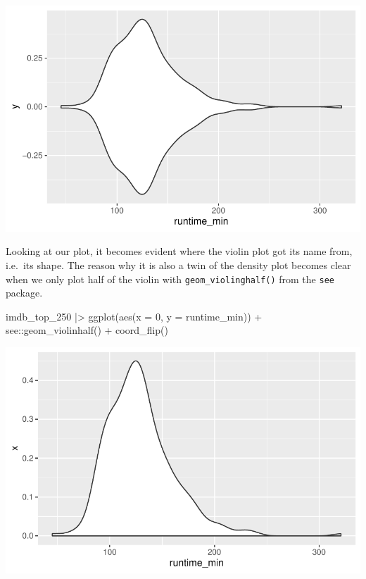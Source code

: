 \documentclass[
  letterpaper,
]{krantz}
\makeatletter
\newenvironment{Shaded}{\begin{snugshade}}{\end{snugshade}}
\newcommand{\AttributeTok}[1]{\textcolor[rgb]{0.40,0.45,0.13}{#1}}
\newcommand{\DecValTok}[1]{\textcolor[rgb]{0.68,0.00,0.00}{#1}}
\newcommand{\FunctionTok}[1]{\textcolor[rgb]{0.28,0.35,0.67}{#1}}
\newcommand{\NormalTok}[1]{\textcolor[rgb]{0.00,0.23,0.31}{#1}}
\newcommand{\SpecialCharTok}[1]{\textcolor[rgb]{0.37,0.37,0.37}{#1}}
\newenvironment{kframe}{%
\medskip{}
\setlength{\fboxsep}{.8em}
 \def\at@end@of@kframe{}%
 \ifinner\ifhmode%
  \def\at@end@of@kframe{\end{minipage}}%
  \begin{minipage}{\columnwidth}%
 \fi\fi%
 \def\FrameCommand##1{\hskip\@totalleftmargin \hskip-\fboxsep
 \colorbox{shadecolor}{##1}\hskip-\fboxsep
     \hskip-\linewidth \hskip-\@totalleftmargin \hskip\columnwidth}%
 \MakeFramed {\advance\hsize-\width
   \@totalleftmargin\z@ \linewidth\hsize
   \@setminipage}}%
 {\par\unskip\endMakeFramed%
 \at@end@of@kframe}
\renewenvironment{Shaded}{\begin{kframe}}{\end{kframe}}
\makeatother
\begin{document}
\includegraphics{08_descriptive_statistics_files/figure-pdf/violin-plot-1.pdf}

Looking at our plot, it becomes evident where the violin plot got its
name from, i.e.~its shape. The reason why it is also a twin of the
density plot becomes clear when we only plot half of the violin with
\texttt{geom\_violinghalf()} from the \texttt{see} package.

\begin{Shaded}
\begin{Highlighting}[]
\NormalTok{imdb\_top\_250 }\SpecialCharTok{|\textgreater{}}
  \FunctionTok{ggplot}\NormalTok{(}\FunctionTok{aes}\NormalTok{(}\AttributeTok{x =} \DecValTok{0}\NormalTok{, }\AttributeTok{y =}\NormalTok{ runtime\_min)) }\SpecialCharTok{+}
\NormalTok{  see}\SpecialCharTok{::}\FunctionTok{geom\_violinhalf}\NormalTok{() }\SpecialCharTok{+}
  \FunctionTok{coord\_flip}\NormalTok{()}
\end{Highlighting}
\end{Shaded}

\includegraphics{08_descriptive_statistics_files/figure-pdf/half-violin-plot-1.pdf}
\end{document}
